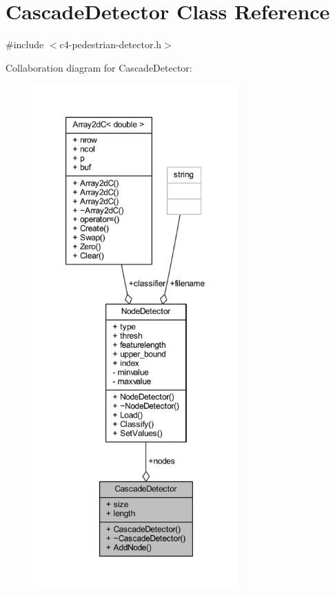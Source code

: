 \hypertarget{class_cascade_detector}{}\section{Cascade\+Detector Class Reference}
\label{class_cascade_detector}


{\ttfamily \#include $<$c4-\/pedestrian-\/detector.\+h$>$}



Collaboration diagram for Cascade\+Detector\+:\nopagebreak
\begin{figure}[H]
\begin{center}
\leavevmode
\includegraphics[height=550pt]{class_cascade_detector__coll__graph}
\end{center}
\end{figure}

